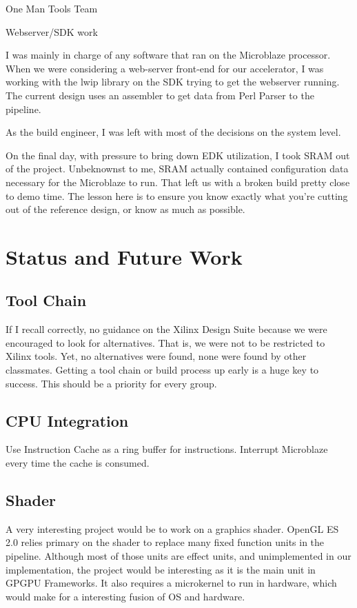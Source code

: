 \documentclass[letterpaper,10pt]{article}
\begin{document}
One Man Tools Team

Webserver/SDK work

I was mainly in charge of any software that ran on the Microblaze processor.  When we were considering a web-server front-end for our accelerator, I was working with the lwip library on the SDK trying to get the webserver running.  The current design uses an assembler to get data from Perl Parser to the pipeline.

As the build engineer, I was left with most of the decisions on the system level.   

On the final day, with pressure to bring down EDK utilization, I took SRAM out of the project.  Unbeknownst to me, SRAM actually contained configuration data necessary for the Microblaze to run.  That left us with a broken build pretty close to demo time.   The lesson here is to ensure you know exactly what you're cutting out of the reference design, or know as much as possible.

\section{Status and Future Work}

\subsection{Tool Chain}
If I recall correctly, no guidance on the Xilinx Design Suite because we were encouraged to look for alternatives.  That is, we were not to be restricted to Xilinx tools.  Yet, no alternatives were found, none were found by other classmates.  Getting a tool chain or build process up early is a huge key to success.  This should be a priority for every group. 	

\subsection{CPU Integration}
Use Instruction Cache as a ring buffer for instructions.  Interrupt Microblaze every time the cache is consumed.

\subsection{Shader}
A very interesting project would be to work on a graphics shader.  OpenGL ES 2.0 relies primary on the shader to replace many fixed function units in the pipeline.  Although most of those units are effect units, and unimplemented in our implementation, the project would be interesting as it is the main unit in GPGPU Frameworks.  It also requires a microkernel to run in hardware, which would make for a interesting fusion of OS and hardware.
\end{document}
